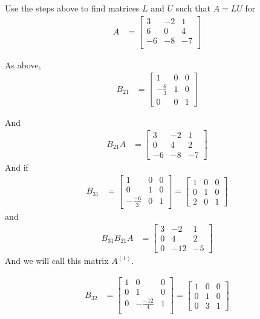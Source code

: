 \begin{example}  \label{ex:lu-decomp} 
Use the steps above to find matrices $L$ and $U$ such that $A=LU$ for
\begin{align*}
A &= \begin{bmatrix}
  3 & -2 &  1 \\
  6 &  0 &  4 \\
 -6 & -8 & -7 \\
\end{bmatrix}
\end{align*}

\solution

As above, 
\begin{align*}
B_{21} & = \begin{bmatrix}
1 & 0 & 0 \\ -\frac{6}{3} & 1 & 0 \\
0 & 0 & 1 
\end{bmatrix}
\end{align*}

And 
\begin{align*}
B_{21} A & = \begin{bmatrix}
3 & -2 & 1 \\
0 & 4 & 2 \\
-6 & -8 & -7 
\end{bmatrix}
\end{align*}
And if
\begin{align*}
B_{31} & = \begin{bmatrix}
1 & 0 & 0 \\
0 & 1 & 0 \\
-\frac{-6}{3} & 0 & 1 
\end{bmatrix} = \begin{bmatrix}
1 & 0 & 0 \\
0 & 1 & 0 \\
2 & 0 & 1
\end{bmatrix}
\end{align*}
and
\begin{align*}
B_{31} B_{21} A & =
\begin{bmatrix}
3 & -2 & 1 \\
0 & 4 & 2 \\
0 & -12 & -5
\end{bmatrix}
\end{align*}
And we will call this matrix $A^{(1)}$. 

\begin{align*}
B_{32} & = \begin{bmatrix}
1 & 0 & 0 \\
0 & 1 & 0 \\
0 & -\frac{-12}{4} & 1 \\
\end{bmatrix}
= \begin{bmatrix}
1 & 0 & 0 \\
0 & 1 & 0 \\
0 & 3 & 1 
\end{bmatrix}
\end{align*}


\end{example}
